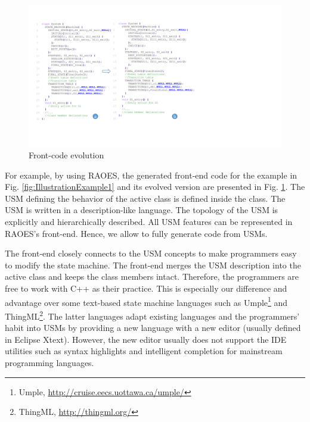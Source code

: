 \begin{figure}
	\centering
	\includegraphics[clip, trim=1.10cm 3.6cm 10.9cm 1.9cm, width=1.08\columnwidth]{figures/frontendoverview.pdf}
	\caption{Front-code evolution} 
	\label{fig:frontend-overview}
\end{figure}

For example, by using RAOES, the generated front-end code for the example in Fig. \ref{fig:IllustrationExample1} and its evolved version are presented in Fig. \ref{fig:frontend-overview}.
The USM defining the behavior of the active class  is defined inside the class.
The USM is written in a description-like language.
The topology of the USM is explicitly and hierarchically described.
All USM features can be represented in RAOES's front-end.
Hence, we allow to fully generate code from USMs.

The front-end closely connects to the USM concepts to make programmers easy to modify the state machine.
The front-end merges the USM description into the active class  and keeps the class members intact. 
Therefore, the programmers are free to work with C++ as their practice.
This is especially our difference and advantage over some text-based state machine languages such as Umple\footnote{Umple, \url{http://cruise.eecs.uottawa.ca/umple/}} and ThingML\footnote{ThingML, \url{http://thingml.org/}}.
The latter languages adapt existing languages and the programmers' habit into USMs by providing a new language with a new editor (usually defined in Eclipse Xtext).
However, the new editor usually does not support the IDE utilities such as syntax highlights and intelligent completion for mainstream programming languages. 



